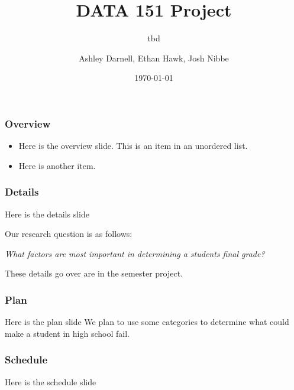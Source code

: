 \documentclass{beamer}
\title{DATA 151 Project}
\subtitle{tbd}
\author{Ashley Darnell, Ethan Hawk, Josh Nibbe}
\institute{Valparaiso Unviersity}
\date{\today}
\begin{document}
\begin{frame}
\titlepage
\end{frame}


\begin{frame}
\frametitle{Overview}
  \begin{itemize}
    \item Here is the overview slide. This is an item in an unordered list.

    \item Here is another item.
  \end{itemize}
\end{frame}


\begin{frame}
\frametitle{Details}
Here is the details slide

Our research question is as follows:

  \begin{center}
    \textit{What factors are most important in determining a students final grade?}
  \end{center}


These details go over are in the semester project.  
\end{frame}


\begin{frame}
\frametitle{Plan}
Here is the plan slide
We plan to use some categories to determine what could make a student in high school fail. 
\end{frame}

\begin{frame}
\frametitle{Schedule}
Here is the schedule slide
\end{frame}
\end{document}
